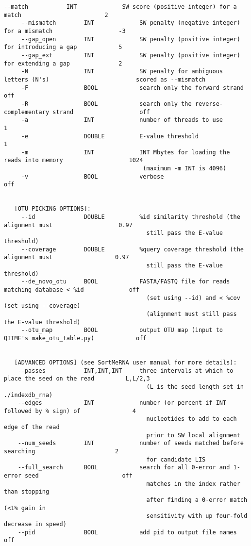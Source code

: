 \documentclass[10pt,a4paper]{article}
\begin{document}
\begin{Verbatim}[fontsize=\footnotesize]
     --match           INT             SW score (positive integer) for a match                        2
     --mismatch        INT             SW penalty (negative integer) for a mismatch                   -3
     --gap_open        INT             SW penalty (positive integer) for introducing a gap            5
     --gap_ext         INT             SW penalty (positive integer) for extending a gap              2
     -N                INT             SW penalty for ambiguous letters (N's)                         scored as --mismatch
     -F                BOOL            search only the forward strand                                 off
     -R                BOOL            search only the reverse-complementary strand                   off
     -a                INT             number of threads to use                                       1
     -e                DOUBLE          E-value threshold                                              1
     -m                INT             INT Mbytes for loading the reads into memory                   1024
                                        (maximum -m INT is 4096)
     -v                BOOL            verbose                                                        off


   [OTU PICKING OPTIONS]: 
     --id              DOUBLE          %id similarity threshold (the alignment must                   0.97
                                         still pass the E-value threshold)
     --coverage        DOUBLE          %query coverage threshold (the alignment must                  0.97
                                         still pass the E-value threshold)
     --de_novo_otu     BOOL            FASTA/FASTQ file for reads matching database < %id             off
                                         (set using --id) and < %cov (set using --coverage) 
                                         (alignment must still pass the E-value threshold)
     --otu_map         BOOL            output OTU map (input to QIIME's make_otu_table.py)            off


   [ADVANCED OPTIONS] (see SortMeRNA user manual for more details): 
    --passes           INT,INT,INT     three intervals at which to place the seed on the read         L,L/2,3
                                         (L is the seed length set in ./indexdb_rna)
    --edges            INT             number (or percent if INT followed by % sign) of               4
                                         nucleotides to add to each edge of the read
                                         prior to SW local alignment 
    --num_seeds        INT             number of seeds matched before searching                       2
                                         for candidate LIS 
    --full_search      BOOL            search for all 0-error and 1-error seed                        off
                                         matches in the index rather than stopping
                                         after finding a 0-error match (<1% gain in
                                         sensitivity with up four-fold decrease in speed)
    --pid              BOOL            add pid to output file names                                   off



\end{Verbatim}
\end{document}
